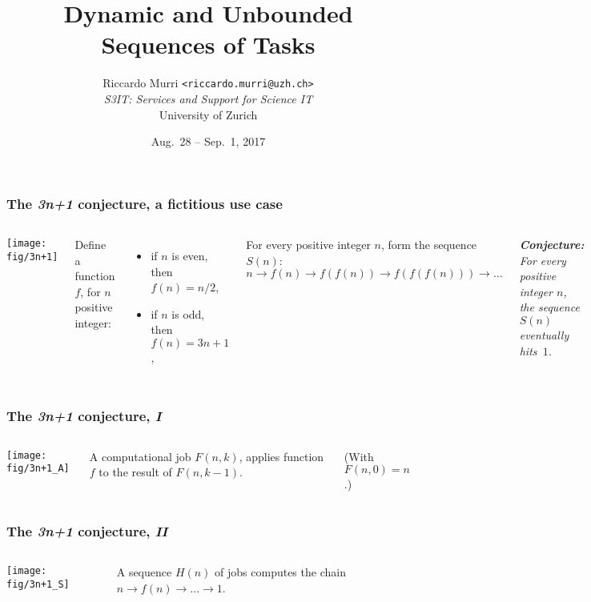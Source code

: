 \documentclass[english,serif,mathserif,xcolor=pdftex,dvipsnames,table]{beamer}
\title[Dynamic Sequences]{%
  Dynamic and Unbounded Sequences of Tasks
}
\author[R. Murri, S3IT UZH]{%
  Riccardo Murri \texttt{<riccardo.murri@uzh.ch>}
  \\[1ex]
  \emph{S3IT: Services and Support for Science IT}
  \\[1ex]
  University of Zurich
}
\date{Aug.~28 -- Sep.~1, 2017}
\begin{document}
\maketitle


\begin{frame}
  \frametitle{The \emph{3n+1} conjecture, a fictitious use case}
  \label{sec:7a}

  \+
  \begin{columns}[c]
    \texttt{[image: fig/3n+1]}

    \small
    Define a function $f$, for $n$ positive integer:
    \begin{itemize}
    \item if $n$ is even, then $f(n) = n / 2$,
    \item if $n$ is odd, then $f(n) = 3n+1$,
    \end{itemize}

    \+
    For every positive integer $n$, form the sequence $S(n)$:
    $n \to f(n) \to f(f(n)) \to f(f(f(n))) \to \ldots$

    \+
    \itshape
    \textbf{Conjecture:} For every positive integer $n$, the sequence $S(n)$
    eventually hits~$1$.
  \end{columns}
\end{frame}

\begin{frame}
  \frametitle{The \emph{3n+1} conjecture, \emph{I}}
  \label{sec:7}

  \+
  \begin{columns}[c]
    \texttt{[image: fig/3n+1\_A]}

    A computational job $F(n,k)$, applies
    function $f$ to the result of $F(n,k-1)$.

    \+
    (With $F(n,0) = n$.)
  \end{columns}
\end{frame}

\begin{frame}
  \frametitle{The \emph{3n+1} conjecture, \emph{II}}
  \label{sec:7b}

  \+
  \begin{columns}[c]
    \texttt{[image: fig/3n+1\_S]}

    A sequence $H(n)$ of jobs computes the
    chain $n \to f(n) \to ... \to 1$.
  \end{columns}
\end{frame}
\end{document}
